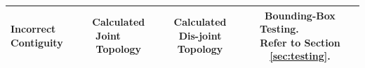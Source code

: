 \begin{table}
\begin{tabularx}{\textwidth}{|m{1.5cm}|C|C|C|}
\centering Incorrect Contiguity &  Calculated Joint ~~~ Topology&  Calculated Dis-joint Topology& Bounding-Box Testing.   ~~~ ~~~ Refer to Section \ref{sec:testing}. \\ \hline

\end{tabularx}
\end{table}
